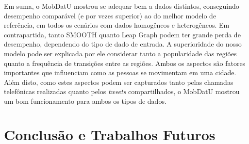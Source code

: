 \documentclass[10pt, a4paper, onecolumn, conference, compsocconf]{IEEEtran}
\begin{document}

Em suma, o MobDatU mostrou se adequar bem a dados distintos, conseguindo desempenho comparável (e por vezes superior) ao do melhor modelo de referência, em todos os cenários com dados homogêneos e heterogêneos.  Em contrapartida, tanto SMOOTH quanto Leap Graph podem ter grande perda de desempenho, dependendo do tipo de dado de entrada. A superioridade do nosso modelo pode ser explicada por ele considerar tanto a popularidade das regiões quanto a frequência de transições entre as regiões. Ambos os aspectos são fatores importantes que influenciam como as pessoas se movimentam em uma cidade. Além disto, como estes aspectos podem ser capturados tanto pelas chamadas telefônicas realizadas quanto pelos {\it tweets} compartilhados, o MobDatU mostrou um bom funcionamento para ambos os tipos de dados.




\section {Conclusão e Trabalhos Futuros}\label{sec:conclusao}

\end{document}
